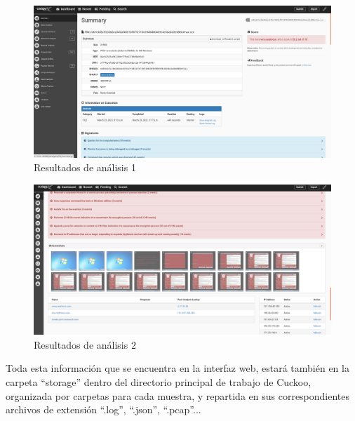 \begin{figure}[h!]
\begin{center}
\includegraphics[width=0.9\linewidth]{images/resultadosanalisis1.png}
\end{center}
\caption{Resultados de análisis 1}
\label{fig:resulanalisis1}
\end{figure}

\begin{figure}[h!]
\begin{center}
\includegraphics[width=0.9\linewidth]{images/resultadosanalisis2.png}
\end{center}
\caption{Resultados de análisis 2}
\label{fig:resulanalisis2}
\end{figure}

Toda esta información que se encuentra en la interfaz web, estará también en la carpeta ``storage'' dentro del directorio principal de trabajo de Cuckoo, organizada por carpetas para cada muestra, y repartida en sus correspondientes archivos de extensión ``.log'', ``.json'', ``.pcap''...
